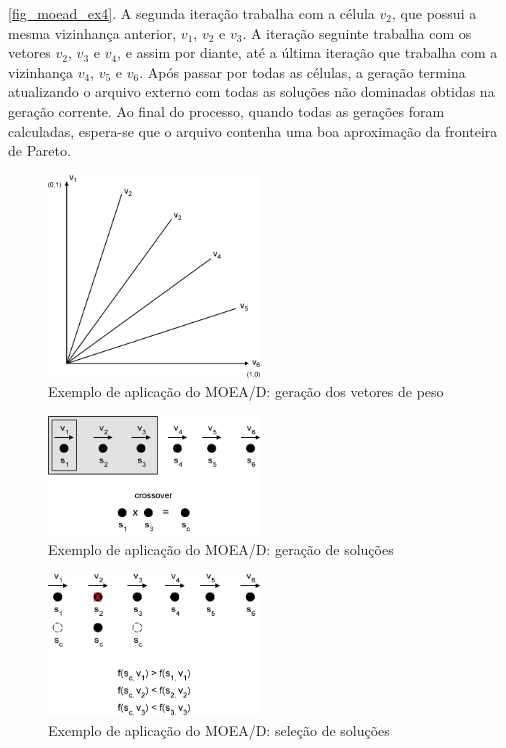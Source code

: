 \autoref{fig_moead_ex4}. A segunda iteração trabalha com a célula $v_2$, que possui a mesma vizinhança anterior, $v_1$, $v_2$ e $v_3$. A iteração seguinte trabalha com os vetores $v_2$, $v_3$ e $v_4$, e assim por diante, até a última iteração que trabalha com a vizinhança $v_4$, $v_5$ e $v_6$. Após passar por todas as células, a geração termina atualizando o arquivo externo com todas as soluções não dominadas obtidas na geração corrente. Ao final do processo, quando todas as gerações foram calculadas, espera-se que o arquivo contenha uma boa aproximação da fronteira de Pareto.

\begin{figure}[!htbp]
	\centering
	\includegraphics[width=0.5\textwidth]{cap_otimizacao-multi/figs/moead-ex1}
	\caption{\label{fig_moead_ex1}Exemplo de aplicação do MOEA/D: geração dos vetores de peso}
\end{figure}

\begin{figure}[!htbp]
	\centering
	\includegraphics[width=0.5\textwidth]{cap_otimizacao-multi/figs/moead-ex2}
	\caption{\label{fig_moead_ex2}Exemplo de aplicação do MOEA/D: geração de soluções}
\end{figure}

\begin{figure}[!htbp]
	\centering
	\includegraphics[width=0.5\textwidth]{cap_otimizacao-multi/figs/moead-ex3}
	\caption{\label{fig_moead_ex3}Exemplo de aplicação do MOEA/D: seleção de soluções}
\end{figure}

